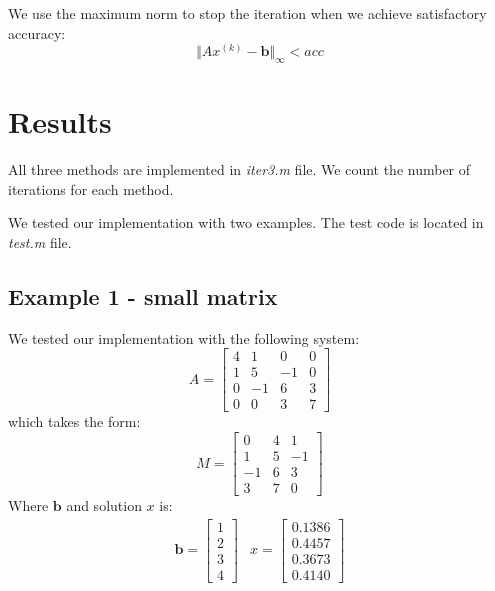 \documentclass[]{article}
\begin{document}
We use the maximum norm to stop the iteration when we achieve satisfactory
accuracy:
\begin{equation*}
	\Vert Ax^{(k)} - \mathbf{b} \Vert_{\infty} < acc
\end{equation*}


\section{Results}

All three methods are implemented in \textit{iter3.m} file. We count the number
of iterations for each method.

We tested our implementation with two examples. The test code is located in
\textit{test.m} file.

\subsection{Example 1 - small matrix}

We tested our implementation with the following system:
\begin{equation*}
		A = \begin{bmatrix}
	4 & 1 & 0 & 0 \\
	1 & 5 & -1 & 0 \\
	0 & -1 & 6 & 3 \\
	0 & 0 & 3	 & 7
	\end{bmatrix}
\end{equation*}
which takes the form:
\begin{equation*}
	M = \begin{bmatrix}
		0 & 4 & 1 \\
		1 & 5 & -1 \\
		-1 & 6 & 3 \\
		3 & 7 & 0
	\end{bmatrix}
\end{equation*}
Where $\mathbf{b}$ and solution $x$ is:
\begin{align*}
	\mathbf{b} = \begin{bmatrix}
		1 \\ 2 \\ 3 \\ 4
	\end{bmatrix}
	&
	x = \begin{bmatrix}
			0.1386 \\ 0.4457 \\ 0.3673 \\ 0.4140
	\end{bmatrix}
\end{align*}
\end{document}
